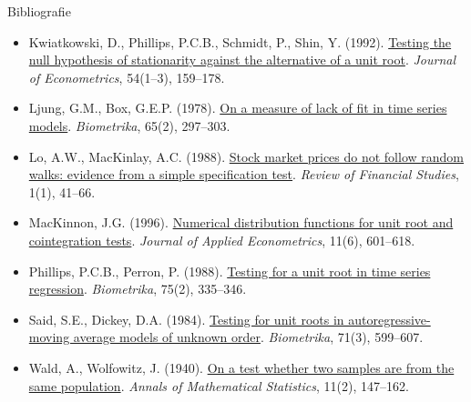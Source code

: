 \begin{frame}{Bibliografie}
\begin{itemize}
    \item Kwiatkowski, D., Phillips, P.C.B., Schmidt, P., Shin, Y. (1992). \href{https://doi.org/10.1016/0304-4076(92)90104-Y}{Testing the null hypothesis of stationarity against the alternative of a unit root}. \textit{Journal of Econometrics}, 54(1--3), 159--178.
    \item Ljung, G.M., Box, G.E.P. (1978). \href{https://doi.org/10.1093/biomet/65.2.297}{On a measure of lack of fit in time series models}. \textit{Biometrika}, 65(2), 297--303.
    \item Lo, A.W., MacKinlay, A.C. (1988). \href{https://doi.org/10.1093/rfs/1.1.41}{Stock market prices do not follow random walks: evidence from a simple specification test}. \textit{Review of Financial Studies}, 1(1), 41--66.
    \item MacKinnon, J.G. (1996). \href{https://doi.org/10.1002/(SICI)1099-1255(199611)11:6<601::AID-JAE417>3.0.CO;2-T}{Numerical distribution functions for unit root and cointegration tests}. \textit{Journal of Applied Econometrics}, 11(6), 601--618.
    \item Phillips, P.C.B., Perron, P. (1988). \href{https://doi.org/10.1093/biomet/75.2.335}{Testing for a unit root in time series regression}. \textit{Biometrika}, 75(2), 335--346.
    \item Said, S.E., Dickey, D.A. (1984). \href{https://doi.org/10.1093/biomet/71.3.599}{Testing for unit roots in autoregressive-moving average models of unknown order}. \textit{Biometrika}, 71(3), 599--607.
    \item Wald, A., Wolfowitz, J. (1940). \href{https://doi.org/10.1214/aoms/1177731909}{On a test whether two samples are from the same population}. \textit{Annals of Mathematical Statistics}, 11(2), 147--162.
\end{itemize}
\end{frame}


